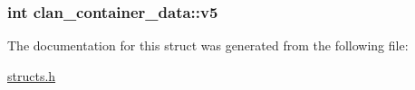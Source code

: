 \hypertarget{structclan__container__data_a50443f46656539c044890e01ede56c0d}{
\subsubsection[{v5}]{\setlength{\rightskip}{0pt plus 5cm}int clan\-\_\-container\-\_\-data\-::v5}}\label{structclan__container__data_a50443f46656539c044890e01ede56c0d}


The documentation for this struct was generated from the following file\-:\begin{DoxyCompactItemize}
\item 
\hyperlink{structs_8h}{structs.\-h}\end{DoxyCompactItemize}
